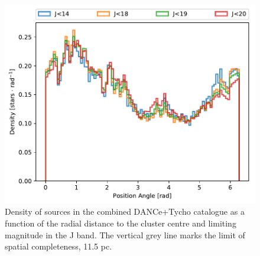 \begin{figure}[ht!]
\begin{center}
\includegraphics[page=2,width=\columnwidth]{./background/Figures/RadiiDistribution_Tycho+DANCe_Jmag.pdf}
\caption{Density of sources in the combined DANCe+Tycho catalogue as a function of the radial distance to the cluster centre and limiting magnitude in the J band. The vertical grey line marks the limit of spatial completeness, 11.5 pc.}
\label{fig:completeness}
\end{center}
\end{figure}




